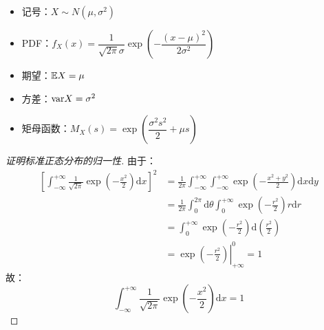 \begin{itemize}[itemsep=1ex]
    \item 记号：$X\sim N(\mu,\sigma^2)$
    \item PDF：$f_X(x)=\dfrac{1}{\sqrt{2\pi}\sigma}\exp\left({-\dfrac{(x-\mu)^2}{2\sigma^2}}\right)$
    \item 期望：$\mathbb{E} X=\mu$
    \item 方差：$\mathrm{var} X=\sigma^2$
    \item 矩母函数：$M_X(s)=\exp\left({\dfrac{\sigma^2s^2}{2}+\mu s}\right)$
\end{itemize}

\begin{proof}[证明标准正态分布的归一性]
由于：
\begin{align*}
\left[\int_{-\infty}^{+\infty}\frac{1}{\sqrt{2\pi}}\exp\left({-\frac{x^2}{2}}\right)\mathrm dx\right]^2&=\frac{1}{2\pi}\int_{-\infty}^{+\infty}\int_{-\infty}^{+\infty}\exp\left({-\frac{x^2+y^2}{2}}\right)\mathrm dx\mathrm dy\\
&=\frac{1}{2\pi}\int_0^{2\pi}\mathrm d\theta\int_{0}^{+\infty}\exp\left({-\frac{r^2}{2}}\right)r\mathrm dr\\
&=\int_0^{+\infty}\exp\left({-\frac{r^2}{2}}\right)\mathrm d\left(\frac{r^2}{2}\right)\\
&=\left.\exp\left({-\frac{r^2}{2}}\right)\right|_{+\infty}^0=1
\end{align*}
故：
\[
\int_{-\infty}^{+\infty}\frac{1}{\sqrt{2\pi}}\exp\left({-\frac{x^2}{2}}\right)\mathrm dx=1
\]
\end{proof}

